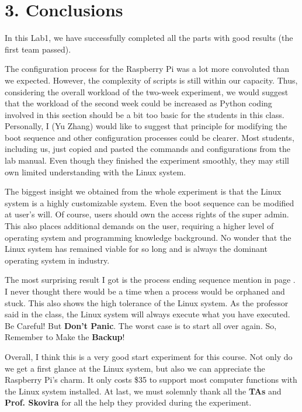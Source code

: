 \documentclass[12pt]{report}
\begin{document}
\section*{3. Conclusions\vspace{-1em}}
In this Lab1, we have successfully completed all the parts with good results (the first team passed).\par
The configuration process for the Raspberry Pi was a lot more convoluted than we expected. However, the complexity of scripts is still within our capacity. Thus, considering the overall workload of the two-week experiment, we would suggest that the workload of the second week could be increased as Python coding involved in this section should be a bit too basic for the students in this class. Personally, I (Yu Zhang) would like to suggest that principle for modifying the boot sequence and other configuration processes could be clearer. Most students, including us, just copied and pasted the commands and configurations from the lab manual. Even though they finished the experiment smoothly, they may still own limited understanding with the Linux system. \par
The biggest insight we obtained from the whole experiment is that the Linux system is a highly customizable system. Even the boot sequence can be modified at user's will. Of course, users should own the access rights of the super admin. This also places additional demands on the user, requiring a higher level of operating system and programming knowledge background. No wonder that the Linux system has remained viable for so long and is always the dominant operating system in industry. \par
The most surprising result I got is the process ending sequence mention in page \pageref{fig:fig8}. I never thought there would be a time when a process would be orphaned and stuck. This also shows the high tolerance of the Linux system. As the professor said in the class, the Linux system will always execute what you have executed. Be Careful! But \textbf{Don't Panic}. The worst case is to start all over again. So, Remember to Make the \textbf{Backup}!\par
Overall, I think this is a very good start experiment for this course. Not only do we get a first glance at the Linux system, but also we can appreciate the Raspberry Pi's charm. It only costs \$35 to support most computer functions with the Linux system installed. At last, we must solemnly thank all the \textbf{TAs} and \textbf{Prof. Skovira} for all the help they provided during the experiment.\par
\end{document}
